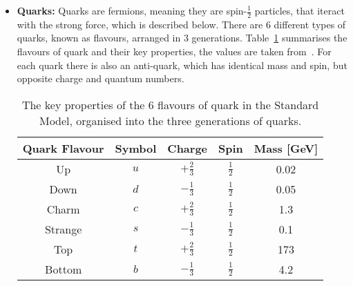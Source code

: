 \begin{itemize}[leftmargin=*]
\item\textbf{Quarks:}
  Quarks are fermions, meaning they are spin-$\frac{1}{2}$ particles,
  that iteract with the strong force, which is described below.
  There are 6 different types of quarks, known as flavours, arranged in 3 generations.
  Table~\ref{tab:theo-sm_quarks} summarises the flavours of quark and their key properties,
  the values are taken from~\cite{obj-bjets_PDG}.
  For each quark there is also an anti-quark, which has identical mass and spin, but opposite charge and quantum numbers.
  {\renewcommand{\arraystretch}{1.5}
  \begin{table}[!ht]
  \begin{center}
    \begin{tabular}{|c||c|c|c|c|}
      \hline
    Quark Flavour & Symbol & Charge            &  Spin           &  Mass [GeV]\\
    \hline
    Up            &   $u$  &  $+\frac{2}{3}$   &  $\frac{1}{2}$  &  0.02\\
    Down          &   $d$  &  $-\frac{1}{3}$   &  $\frac{1}{2}$  &  0.05\\
    \hline                                                   
    Charm         &   $c$  &  $+\frac{2}{3}$   &  $\frac{1}{2}$  &  1.3 \\
    Strange       &   $s$  &  $-\frac{1}{3}$   &  $\frac{1}{2}$  &  0.1 \\
    \hline                                                      
    Top           &   $t$  &  $+\frac{2}{3}$   &  $\frac{1}{2}$  &  173  \\
    Bottom        &   $b$  &  $-\frac{1}{3}$   &  $\frac{1}{2}$  &  4.2  \\
    \hline  
  \end{tabular}
    \caption{The key properties of the 6 flavours of quark in the Standard Model,
    organised into the three generations of quarks.}
  \label{tab:theo-sm_quarks}
  \end{center}
  \end{table}}


\end{itemize}
